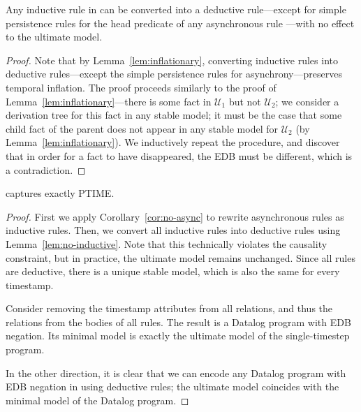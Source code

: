 \begin{lemma}
\label{lem:no-inductive}
Any inductive rule in \slang can be converted into a deductive rule---except for simple persistence rules for the head predicate of any asynchronous rule ---with no effect to the ultimate model.
\end{lemma}
\begin{proof}
Note that by Lemma~\ref{lem:inflationary}, converting inductive rules into deductive rules---except the simple persistence rules for asynchrony---preserves temporal inflation.  The proof proceeds similarly to the proof of Lemma~\ref{lem:inflationary}---there is some fact in $\mathcal{U}_1$ but not $\mathcal{U}_2$; we consider a derivation tree for this fact in any stable model; it must be the case that some child fact of the parent does not appear in any stable model for $\mathcal{U}_2$ (by Lemma~\ref{lem:inflationary}).  We inductively repeat the procedure, and discover that in order for a fact to have disappeared, the EDB must be different, which is a contradiction.
\end{proof}


\begin{theorem}
\label{thm:ptime}
\slang captures exactly PTIME.
\end{theorem}
\begin{proof}
First we apply Corollary~\ref{cor:no-async} to rewrite asynchronous rules as inductive rules.  Then, we convert all inductive rules into deductive rules using Lemma~\ref{lem:no-inductive}.  Note that this technically violates the causality constraint, but in practice, the ultimate model remains unchanged.  Since all rules are deductive, there is a unique stable model, which is also the same for every timestamp.

Consider removing the timestamp attributes from all relations, and thus the  relations from the bodies of all rules.  The result is a Datalog program with EDB negation.  Its minimal model is exactly the ultimate model of the single-timestep \slang program.

In the other direction, it is clear that we can encode any Datalog program with EDB negation in \slang using deductive rules; the ultimate model coincides with the minimal model of the Datalog program.
\end{proof}

